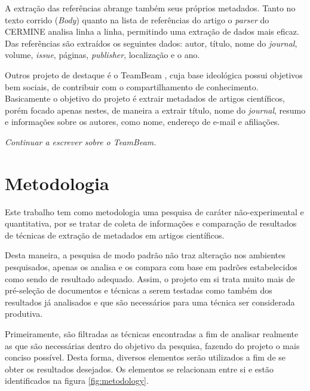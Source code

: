 \documentclass[
	12pt,               %
	openright,          %
	twoside,            %
	a4paper,            %
	english,            %
	brazil              %
	]{abntex2}
\begin{document}
A extração das referências abrange também seus próprios metadados. Tanto no texto corrido (\textit{Body}) quanto na lista de referências do artigo o \textit{parser} do CERMINE analisa linha a linha, permitindo uma extração de dados mais eficaz. Das referências são extraídos os seguintes dados: autor, título, nome do \textit{journal}, volume, \textit{issue}, páginas, \textit{publisher}, localização e o ano.


Outros projeto de destaque é o TeamBeam \cite{teambeam}, cuja base ideológica possui objetivos bem sociais, de contribuir com o compartilhamento de conhecimento. Basicamente o objetivo do projeto é extrair metadados de artigos científicos, porém focado apenas nestes, de maneira a extrair título, nome do \textit{journal}, resumo e informações sobre os autores, como nome, endereço de e-mail e afiliações.

\textit{Continuar a escrever sobre o TeamBeam.}




	

	 

\chapter{Metodologia}

Este trabalho tem como metodologia uma pesquisa de caráter não-experimental e quantitativa, por se tratar de coleta de informações e comparação de resultados de técnicas de extração de metadados em artigos científicos.

Desta maneira, a pesquisa de modo padrão não traz alteração nos ambientes pesquisados, apenas os analisa e os compara com base em padrões estabelecidos como sendo de resultado adequado. Assim, o projeto em si trata muito mais de pré-seleção de documentos e técnicas a serem testadas como também dos resultados já analisados e que são necessários para uma técnica ser considerada produtiva.


Primeiramente, são filtradas as técnicas encontradas a fim de analisar realmente as que são necessárias dentro do objetivo da pesquisa, fazendo do projeto o mais conciso possível. Desta forma, diversos elementos serão utilizados a fim de se obter os resultados desejados. Os elementos se relacionam entre si e estão identificados na figura \ref{fig:metodology}. 
\end{document}
